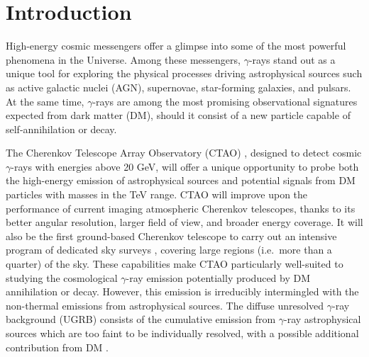 \section{Introduction}\label{sec:Intro}

{High-energy cosmic messengers offer a glimpse into some of the most powerful phenomena in the Universe. Among these messengers, $\gamma$-rays stand out as a unique tool for exploring the physical processes driving astrophysical sources such as active galactic nuclei (AGN), supernovae, star-forming galaxies, and pulsars. At the same time, $\gamma$-rays are among the most promising observational signatures expected from dark matter (DM), should it consist of a new particle capable of self-annihilation or decay.}

The Cherenkov Telescope Array Observatory (CTAO) \cite{CTAConsortium:2018tzg, mazin2019cherenkov}, designed to detect cosmic $\gamma$-rays with energies above 20 GeV, will offer a unique opportunity to probe both the high-energy emission of astrophysical sources and potential signals from DM particles with masses in the TeV range. CTAO will improve upon the performance of current imaging atmospheric Cherenkov telescopes, thanks to its better angular resolution, larger field of view, and broader energy coverage. It will also be the first ground-based Cherenkov telescope to carry out an intensive program of dedicated sky surveys {\cite{CTAConsortium:2018tzg, mazin2019cherenkov}}, covering large regions (i.e.\ more than a quarter) of the sky. These capabilities make CTAO particularly well-suited to studying the cosmological $\gamma$-ray emission potentially produced by DM annihilation or decay. However, this emission is irreducibly intermingled with the non-thermal emissions from astrophysical sources. The diffuse unresolved $\gamma$-ray background \cite{Fornasa_2015} (UGRB) consists of the cumulative emission from $\gamma$-ray astrophysical sources which are too faint to be individually resolved, with a possible additional contribution from DM \cite{Ajello:2015mfa}.

